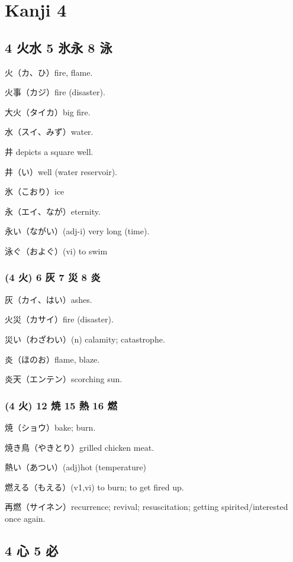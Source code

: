 \chapter{Kanji 4}

\section{4 火水 5 氷永 8 泳}

火（カ、ひ）fire, flame.

火事（カジ）fire (disaster).

大火（タイカ）big fire.

水（スイ、みず）water.

井 depicts a square well.

井（い）well (water reservoir).

氷（こおり）ice

永（エイ、なが）eternity.

永い（ながい）(adj-i) very long (time).

泳ぐ（およぐ）(vi) to swim

\subsection{(4 火) 6 灰 7 災 8 炎}

灰（カイ、はい）ashes.

火災（カサイ）fire (disaster).

災い（わざわい）(n) calamity; catastrophe.

炎（ほのお）flame, blaze.

炎天（エンテン）scorching sun.

\subsection{(4 火) 12 焼 15 熱 16 燃}

焼（ショウ）bake; burn.

焼き鳥（やきとり）grilled chicken meat.

熱い（あつい）(adj)hot (temperature)

燃える（もえる）(v1,vi) to burn; to get fired up.

再燃（サイネン）recurrence; revival; resuscitation;
getting spirited/interested once again.

\section{4 心 5 必}

